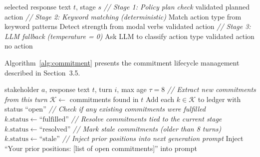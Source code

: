\documentclass[12pt, a4paper]{report}
\begin{document}
\begin{algorithm}[ht]
\caption{Action Extraction Pipeline}
\label{alg:action}
\begin{algorithmic}[1]
\Require selected response text $t$, stage $s$
\State \textit{// Stage 1: Policy plan check}
    \State \Return validated planned action
\EndIf
\State \textit{// Stage 2: Keyword matching (deterministic)}
    \State Match action type from keyword patterns
    \State Detect strength from modal verbs
        \State \Return validated action
    \EndIf
\EndIf
\State \textit{// Stage 3: LLM fallback (temperature = 0)}
    \State Ask LLM to classify action type 
        \State \Return validated action
    \EndIf
\EndIf
\State \Return no action
\end{algorithmic}
\end{algorithm}

Algorithm~\ref{alg:commitment} presents the commitment lifecycle management described in Section~3.5.

\begin{algorithm}[ht]
\caption{Commitment Lifecycle Management}
\label{alg:commitment}
\begin{algorithmic}[1]
\Require stakeholder $a$, response text $t$, turn $i$, max age $\tau = 8$
\State \textit{// Extract new commitments from this turn}
\State $\mathcal{K} \gets$ commitments found in $t$ 
\State Add each $k \in \mathcal{K}$ to ledger with status ``open''
\State \textit{// Check if any existing commitments were fulfilled}
        \State $k.\text{status} \gets \text{``fulfilled''}$
    \EndIf
\EndFor
\State \textit{// Resolve commitments tied to the current stage}
    \State $k.\text{status} \gets \text{``resolved''}$
\EndFor
\State \textit{// Mark stale commitments (older than 8 turns)}
    \State $k.\text{status} \gets \text{``stale''}$
\EndFor
\State \textit{// Inject prior positions into next generation prompt}
\State Inject ``Your prior positions: [list of open commitments]'' into prompt
\end{algorithmic}
\end{algorithm}


\end{document}
